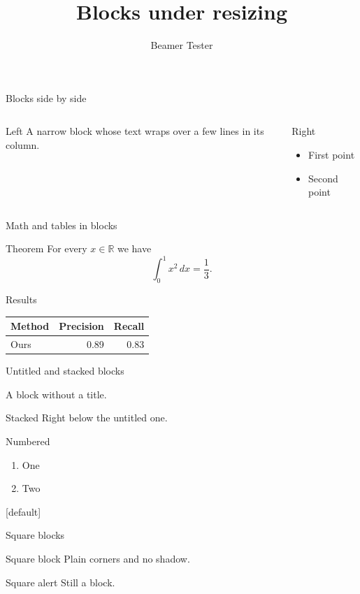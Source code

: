 \documentclass{beamer}
\title{Blocks under resizing}
\author{Beamer Tester}
\begin{document}
\begin{frame}{Blocks side by side}
  \begin{columns}[T]
    \begin{block}{Left}
      A narrow block whose text wraps over a few lines in its column.
    \end{block}
    \begin{alertblock}{Right}
      \begin{itemize}
        \item First point
        \item Second point
      \end{itemize}
    \end{alertblock}
  \end{columns}
\end{frame}

\begin{frame}{Math and tables in blocks}
  \begin{block}{Theorem}
    For every $x \in \mathbb{R}$ we have
    \[ \int_0^1 x^2 \, dx = \frac{1}{3}. \]
  \end{block}
  \begin{exampleblock}{Results}
    \centering
    \begin{tabular}{lrr}
      \toprule
      Method & Precision & Recall \\
      \midrule
      Ours & 0.89 & 0.83 \\
      \bottomrule
    \end{tabular}
  \end{exampleblock}
\end{frame}

\begin{frame}{Untitled and stacked blocks}
  \begin{block}{}
    A block without a title.
  \end{block}
  \vspace{-0.5em}
  \begin{block}{Stacked}
    Right below the untitled one.
  \end{block}
  \begin{alertblock}{Numbered}
    \begin{enumerate}
      \item One
      \item Two
    \end{enumerate}
  \end{alertblock}
\end{frame}

{
[default]
\begin{frame}{Square blocks}
  \begin{block}{Square block}
    Plain corners and no shadow.
  \end{block}
  \begin{alertblock}{Square alert}
    Still a block.
  \end{alertblock}
\end{frame}
}
\end{document}
